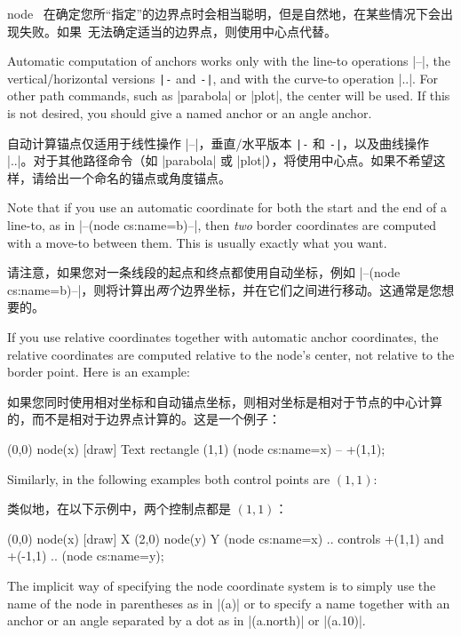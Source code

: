 \begin{coordinatesystem}{node}
    \tikzname\ 在确定您所“指定”的边界点时会相当聪明，但是自然地，在某些情况下会出现失败。如果\tikzname\ 无法确定适当的边界点，则使用中心点代替。


    Automatic computation of anchors works only with the line-to operations
    |--|, the vertical/horizontal versions \verb!|-! and \verb!-|!, and with
    the curve-to operation |..|. For other path commands, such as |parabola| or
    |plot|, the center will be used. If this is not desired, you should give a
    named anchor or an angle anchor.

    自动计算锚点仅适用于线性操作 |--|，垂直/水平版本 \verb!|-! 和 \verb!-|!，以及曲线操作 |..|。对于其他路径命令（如 |parabola| 或 |plot|），将使用中心点。如果不希望这样，请给出一个命名的锚点或角度锚点。


    Note that if you use an automatic coordinate for both the start and the end
    of a line-to, as in |--(node cs:name=b)--|, then \emph{two} border
    coordinates are computed with a move-to between them. This is usually
    exactly what you want.

    请注意，如果您对一条线段的起点和终点都使用自动坐标，例如 |--(node cs:name=b)--|，则将计算出\emph{两个}边界坐标，并在它们之间进行移动。这通常是您想要的。


    If you use relative coordinates together with automatic anchor coordinates,
    the relative coordinates are computed relative to the node's center, not
    relative to the border point. Here is an example:
    
    如果您同时使用相对坐标和自动锚点坐标，则相对坐标是相对于节点的中心计算的，而不是相对于边界点计算的。这是一个例子：%
\begin{codeexample}[]
\tikz \draw (0,0) node(x) [draw] {Text}
            rectangle (1,1)
            (node cs:name=x) -- +(1,1);
\end{codeexample}

    Similarly, in the following examples both control points are $(1,1)$:
    
    类似地，在以下示例中，两个控制点都是 $(1,1)$：
%
\begin{codeexample}[]
\tikz \draw (0,0) node(x) [draw] {X}
            (2,0) node(y) {Y}
            (node cs:name=x) .. controls +(1,1) and +(-1,1) ..
            (node cs:name=y);
\end{codeexample}

    The implicit way of specifying the node coordinate system is to simply use
    the name of the node in parentheses as in |(a)| or to specify a name
    together with an anchor or an angle separated by a dot as in |(a.north)| or
    |(a.10)|.


\end{coordinatesystem}
